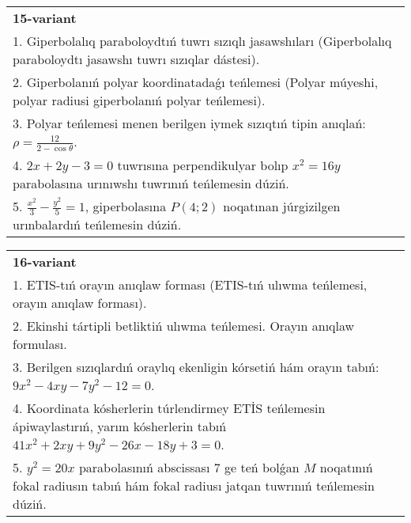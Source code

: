 \documentclass{article}
\begin{document}
\begin{tabular}{m{17cm}}
\textbf{15-variant}\\
1. Giperbolalıq paraboloydtıń tuwrı sızıqlı jasawshıları (Giperbolalıq paraboloydtı jasawshı tuwrı sızıqlar dástesi).\\

2. Giperbolanıń polyar koordinatadaǵı teńlemesi (Polyar múyeshi, polyar radiusi giperbolanıń polyar teńlemesi).\\

3. Polyar teńlemesi menen berilgen iymek sızıqtıń tipin anıqlań: $\rho=\frac{12}{2-\cos\theta}$.\\

4. $2x + 2y - 3 = 0$ tuwrısına perpendikulyar bolıp $x^{2} = 16y$ parabolasına urınıwshı tuwrınıń teńlemesin dúziń.  \\

5. $\frac{x^{2}}{3} - \frac{y^{2}}{5} = 1$, giperbolasına $P(4;2)$ noqatınan júrgizilgen urınbalardıń teńlemesin dúziń.  
\end{tabular}
\vspace{1cm}


\begin{tabular}{m{17cm}}
\textbf{16-variant}\\
1. ETIS-tıń orayın anıqlaw forması (ETIS-tıń ulıwma teńlemesi, orayın anıqlaw forması).\\

2. Ekinshi tártipli betliktiń ulıwma teńlemesi. Orayın anıqlaw formulası.\\

3. Berilgen sızıqlardıń oraylıq ekenligin kórsetiń hám orayın tabıń: $9 x^{2}-4 xy-7 y^{2}-12=0$.\\

4. Koordinata kósherlerin túrlendirmey ETİS teńlemesin ápiwaylastırıń, yarım kósherlerin tabıń $41x^{2} + 2xy + 9y^{2} - 26x - 18y + 3 = 0$.  \\

5. $y^{2} = 20x$ parabolasınıń abscissası 7 ge teń bolǵan $M$ noqatınıń fokal radiusın tabıń hám fokal radiusı jatqan tuwrınıń teńlemesin dúziń.  
\end{tabular}
\vspace{1cm}
\end{document}
